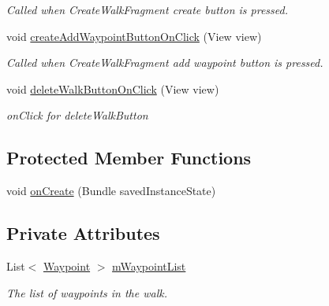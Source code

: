 \begin{DoxyCompactItemize}
\begin{DoxyCompactList}\small\item\em Called when Create\+Walk\+Fragment create button is pressed. \end{DoxyCompactList}\item 
void \hyperlink{classuk_1_1ac_1_1swan_1_1digitaltrails_1_1activities_1_1_my_walks_activity_a248e237d3d0746d5da2d37906bb51741}{create\+Add\+Waypoint\+Button\+On\+Click} (View view)
\begin{DoxyCompactList}\small\item\em Called when Create\+Walk\+Fragment add waypoint button is pressed. \end{DoxyCompactList}\item 
void \hyperlink{classuk_1_1ac_1_1swan_1_1digitaltrails_1_1activities_1_1_my_walks_activity_ab39c63d4397d050d178607f43ea792b8}{delete\+Walk\+Button\+On\+Click} (View view)
\begin{DoxyCompactList}\small\item\em on\+Click for delete\+Walk\+Button \end{DoxyCompactList}\end{DoxyCompactItemize}
\subsection*{Protected Member Functions}
\begin{DoxyCompactItemize}
\item 
void \hyperlink{classuk_1_1ac_1_1swan_1_1digitaltrails_1_1activities_1_1_my_walks_activity_aa1af7616643652f014ab778c0c9fe218}{on\+Create} (Bundle saved\+Instance\+State)
\end{DoxyCompactItemize}
\subsection*{Private Attributes}
\begin{DoxyCompactItemize}
\item 
List$<$ \hyperlink{classuk_1_1ac_1_1swan_1_1digitaltrails_1_1components_1_1_waypoint}{Waypoint} $>$ \hyperlink{classuk_1_1ac_1_1swan_1_1digitaltrails_1_1activities_1_1_my_walks_activity_abaa9edf03870a21927df2f8ed65d6f09}{m\+Waypoint\+List}
\begin{DoxyCompactList}\small\item\em The list of waypoints in the walk. \end{DoxyCompactList}\end{DoxyCompactItemize}
